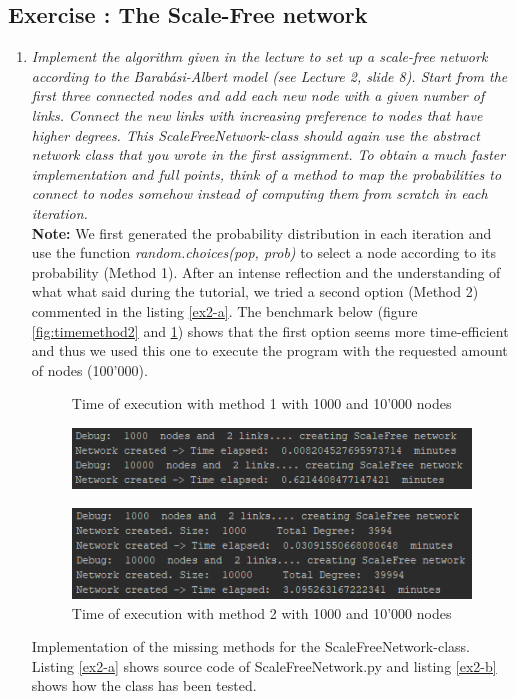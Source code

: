 \documentclass[10pt,a4paper]{article}
\newcommand{\exercise}[1]
{
  \stepcounter{subsection}
  \subsection*{Exercise \thesubsection: #1}

}
\begin{document}
\exercise{The Scale-Free network}
\begin{enumerate}
\item \textit{Implement the algorithm given in the lecture to set up a scale-free network according to the
	Barabási-Albert model (see Lecture 2, slide 8). Start from the first three connected nodes
	and add each new node with a given number of links. Connect the new links with increasing
	preference to nodes that have higher degrees. This ScaleFreeNetwork-class should again
	use the abstract network class that you wrote in the first assignment.
	To obtain a much faster implementation and full points, think of a method to map the
	probabilities to connect to nodes somehow instead of computing them from scratch in each
	iteration.}\\

\textbf{Note:} We first generated the probability distribution in each iteration and use the function \textit{random.choices(pop, prob)} to select a node according to its probability (Method 1). After an intense reflection and the understanding of what what said during the tutorial, we tried a second option (Method 2) commented in the listing \ref{ex2-a}. The benchmark below (figure \ref{fig:timemethod2} and \ref{fig:timemethod1}) shows that the first option seems more time-efficient and thus we used this one to execute the program with the requested amount of nodes (100'000). 


\begin{figure}[H]
	\centering
	\label{fig:timemethod2}
	\caption{Time of execution with method 1 with 1000 and 10'000 nodes}
	\includegraphics[width=0.7\linewidth]{img/time_method1}
	\label{fig:timemethod1}
	\caption{Time of execution with method 2 with 1000 and 10'000 nodes}
	\includegraphics[width=0.7\linewidth]{img/time_method2}
\end{figure}


Implementation of the missing methods for the ScaleFreeNetwork-class. Listing \ref{ex2-a} shows source code of ScaleFreeNetwork.py and listing \ref{ex2-b} shows how the class has been tested.


\end{enumerate}
\end{document}
